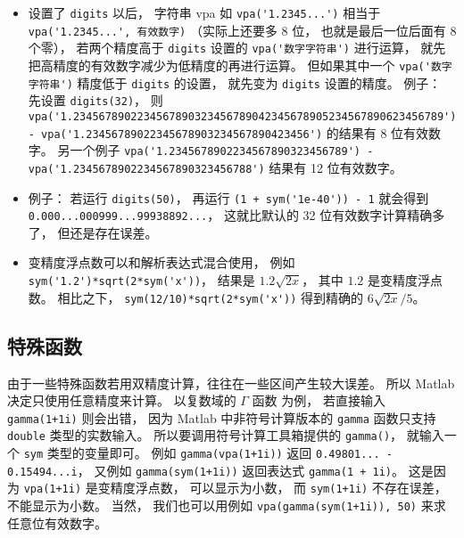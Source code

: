 \begin{itemize}
\item 设置了 \verb|digits| 以后， 字符串 vpa 如 \verb|vpa('1.2345...')| 相当于 \verb|vpa('1.2345...', 有效数字)| （实际上还要多 8 位， 也就是最后一位后面有 8 个零）， 若两个精度高于 \verb|digits| 设置的 \verb|vpa('数字字符串')| 进行运算， 就先把高精度的有效数字减少为低精度的再进行运算。 但如果其中一个 \verb|vpa('数字字符串')| 精度低于 \verb|digits| 的设置， 就先变为 \verb|digits| 设置的精度。 例子： 先设置 \verb|digits(32)|， 则 \verb|vpa('1.2345678902234567890323456789042345678905234567890623456789') - vpa('1.23456789022345678903234567890423456')| 的结果有 8 位有效数字。 另一个例子 \verb|vpa('1.2345678902234567890323456789') - vpa('1.2345678902234567890323456788')| 结果有 12 位有效数字。

\item 例子： 若运行 \verb|digits(50)|， 再运行 \verb|(1 + sym('1e-40')) - 1| 就会得到 \verb|0.000...000999...99938892...|， 这就比默认的 32 位有效数字计算精确多了， 但还是存在误差。

\item 变精度浮点数可以和解析表达式混合使用， 例如 \verb|sym('1.2')*sqrt(2*sym('x'))|， 结果是 $1.2 \sqrt{2x}$， 其中 $1.2$ 是变精度浮点数。 相比之下， \verb|sym(12/10)*sqrt(2*sym('x'))| 得到精确的 $6\sqrt{2x}/5$。
\end{itemize}

\subsection{特殊函数}
由于一些特殊函数若用双精度计算，往往在一些区间产生较大误差。 所以 Matlab 决定只使用任意精度来计算。 以复数域的 $\Gamma$ 函数 为例， 若直接输入 \verb|gamma(1+1i)| 则会出错， 因为 Matlab 中非符号计算版本的 \verb|gamma| 函数只支持 \verb|double| 类型的实数输入。 所以要调用符号计算工具箱提供的 \verb|gamma()|， 就输入一个 \verb|sym| 类型的变量即可。 例如 \verb|gamma(vpa(1+1i))| 返回 \verb|0.49801... - 0.15494...i|， 又例如 \verb|gamma(sym(1+1i))| 返回表达式 \verb|gamma(1 + 1i)|。 这是因为 \verb|vpa(1+1i)| 是变精度浮点数， 可以显示为小数， 而 \verb|sym(1+1i)| 不存在误差， 不能显示为小数。 当然， 我们也可以用例如 \verb|vpa(gamma(sym(1+1i)), 50)| 来求任意位有效数字。
